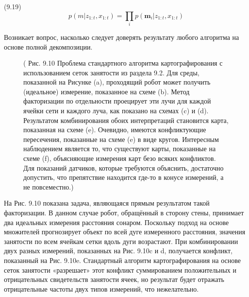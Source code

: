 \documentclass[10pt,a4paper]{article}
\begin{document}
(9.19)
$$p(m|z_{1:t},x_{1:t})=\prod_i p(\textbf{m}_i|z_{1:t},x_{1:t})$$

Возникает вопрос, насколько следует доверять результату любого алгоритма на основе полной декомпозиции.

\begin{figure}[H]
	\caption{ ( Рис. 9.10 Проблема стандартного алгоритма картографирования с использованием сеток занятости из раздела 9.2. Для среды, показанной на Рисунке (a), проходящий робот может получить (идеальное) измерение, показанное на схеме (b). Метод факторизации по отдельности проецирует эти лучи для каждой ячейки сети и каждого луча, как показано на схемах (c) и (d). Результатом комбинирования обоих интерпретаций становится карта, показанная на схеме (e). Очевидно, имеются конфликтующие пересечения, показанные на схеме (e) в виде кругов. Интересным наблюдением является то, что существуют карты, показанные на схеме (f), объясняющие измерения карт безо всяких конфликтов. Для показаний датчиков, которые требуются объяснить, достаточно допустить, что препятствие находится где-то в конусе измерений, а не повсеместно.)}
	\label{fig:910orig}
\end{figure}

На Рис. 9.10 показана задача, являющаяся прямым результатом такой факторизации. В данном случае робот, обращённый в сторону стены, принимает два идеальных измерения расстояния сонаром. Поскольку подход на основе множителей прогнозирует объект по всей дуге измеренного расстояния, значения занятости по всем ячейкам сетки вдоль дуги возрастают. При комбинировании двух разных измерений, показанных на Рис. 9.10c и d, получается конфликт, показанный на Рис. 9.10e. Стандартный алгоритм картографирования на основе сеток занятости «разрешает» этот конфликт суммированием положительных и отрицательных свидетельств занятости ячеек, но результат будет отражать отрицательные частоты двух типов измерений, что нежелательно. 
\end{document}
